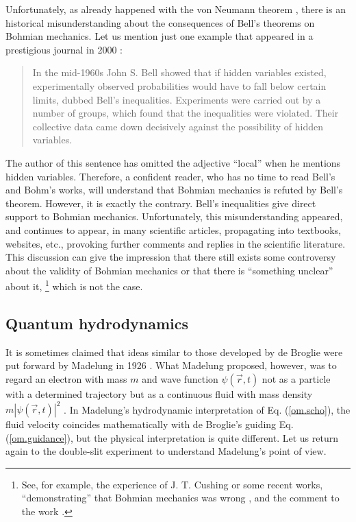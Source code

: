 \documentclass[onecolumn,nofootinbib, secnumarabic, amsmath, nobibnotes,11pt,aps,pra]{revtex4-1}
\newcommand{\eref}[1]{Eq. (\ref{#1})}
\newcommand{\abs}[1]{\left| #1 \right|} %
\begin{document}
Unfortunately, as already happened with the von Neumann theorem \cite{om.impossibility_proofs}, there is an historical misunderstanding about the consequences of Bell's theorems on Bohmian mechanics. Let us mention just one example that appeared in a prestigious journal in 2000 \cite{om.100years}:\vspace*{-6pt}\\
\begin{quote}
In the mid-1960s John S. Bell showed that if hidden variables existed, experimentally observed probabilities would have to fall below certain limits, dubbed Bell's inequalities. Experiments were carried out by a number of groups, which found that the inequalities were violated. Their collective data came down decisively against the possibility of hidden variables.\vspace*{-6pt}\\
\end{quote}
The author of this sentence has omitted the adjective ``local'' when
he mentions hidden variables. Therefore, a confident reader, who has
no time to read Bell's and Bohm's works, will understand that
Bohmian mechanics is refuted by Bell's theorem. However, it is
exactly the contrary. Bell's inequalities give direct support to
Bohmian mechanics. Unfortunately, this misunderstanding appeared,
and continues to appear, in many scientific articles, propagating
into textbooks, websites, etc., provoking further comments and
replies in the scientific literature. This discussion can give the
impression that there still exists some controversy about the
validity of Bohmian mechanics or that there is ``something unclear''
about  it,%
\footnote{See, for example, the experience
of J. T. Cushing \cite{om.erors2} or some recent works,
``demonstrating'' that Bohmian mechanics was wrong
\cite{om.bifoton2}, and the comment to the work
\cite{om.bifoton1}.} which is not the case.\enlargethispage{-1pc}

\subsection{Quantum hydrodynamics}\label{om.sec_intro.9}

It is sometimes claimed that ideas similar to those developed by de Broglie were put forward by Madelung in 1926 \cite{om.Madelung}. What Madelung proposed, however, was to regard an electron with mass $m$ and wave function $\psi(\vec{r},t)$ not as a particle with a determined trajectory but as a continuous fluid with mass density $m \abs{\psi(\vec{r},t)}^2$ \cite{om.wyatt2005,om.Takabayasi}. In Madelung's hydrodynamic interpretation of \eref{om.scho}, the fluid velocity coincides mathematically with de Broglie's guiding \eref{om.guidance}, but the physical interpretation is quite different.
Let us return again to the double-slit experiment to understand Madelung's point of view.
\end{document}
